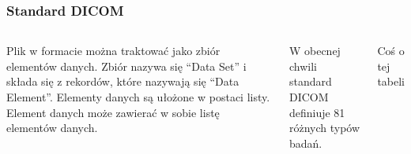 \documentclass[aspectratio=169]{beamer}
\begin{document}
\begin{frame}[t]
    \frametitle{Standard DICOM}
    \begin{columns}[t]

        \scriptsize

        \vspace{-8em}
        Plik w formacie \DICOM można traktować jako zbiór elementów danych.
        Zbiór nazywa się \enquote{Data Set} i składa się z rekordów, które nazywają się \enquote{Data Element}.
        Elementy danych są ułożone w postaci listy.
        Element danych może zawierać w sobie listę elementów danych.


        W obecnej chwili standard DICOM definiuje 81 różnych typów badań.

        Coś o tej tabeli


\end{columns}
\end{frame}
\end{document}
